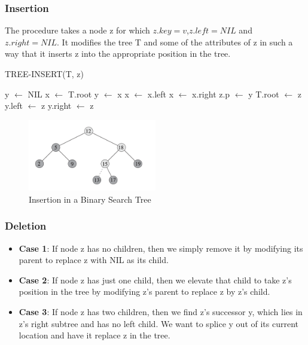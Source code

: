 \subsubsection*{Insertion}

The procedure takes a node z for which $z.key = v$,$ z.left = NIL$ and $z.right = NIL$. 
It modifies the tree T and some of the attributes of z in such a way that it inserts
z into the appropriate position in the tree.

\begin{algorithm}[H]
    \caption{TREE-INSERT(T, z)}
    \begin{algorithmic}[1]
        \State y $\gets$ NIL
        \State x $\gets$ T.root
            \State y $\gets$ x
                \State x $\gets$ x.left
            \Else
                \State x $\gets$ x.right
            \EndIf
        \EndWhile
        \State z.p $\gets$ y
            \State T.root $\gets$ z
            \State y.left $\gets$ z
        \Else
            \State y.right $\gets$ z
        \EndIf
    \end{algorithmic}
\end{algorithm}

\begin{figure}[H]
    \centering
    \includegraphics[width=0.5\textwidth]{assets/insertion_bt.png}
    \caption{Insertion in a Binary Search Tree}
\end{figure}

\subsubsection*{Deletion}

\begin{itemize}
    \item \textbf{Case 1}: If node z has no children, then we simply remove it by modifying its parent to replace z with NIL as its child.
    \item \textbf{Case 2}: If node z has just one child, then we elevate that child to take z’s position in the tree by modifying z’s parent to replace z by z’s child.
    \item \textbf{Case 3}: If node z has two children, then we find z’s successor y, which lies in z’s right subtree and has no left child. We want to splice y out of its current location and have it replace z in the tree.
\end{itemize}

